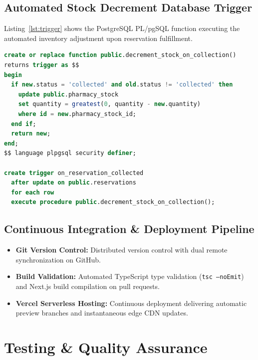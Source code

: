 \documentclass[12pt,a4paper]{report}
\begin{document}
\section{Automated Stock Decrement Database Trigger}
Listing~\ref{lst:trigger} shows the PostgreSQL PL/pgSQL function executing the automated inventory adjustment upon reservation fulfillment.

\begin{lstlisting}[language=SQL, caption={PostgreSQL Stock Decrement Function and Trigger}, label={lst:trigger}]
create or replace function public.decrement_stock_on_collection()
returns trigger as $$
begin
  if new.status = 'collected' and old.status != 'collected' then
    update public.pharmacy_stock
    set quantity = greatest(0, quantity - new.quantity)
    where id = new.pharmacy_stock_id;
  end if;
  return new;
end;
$$ language plpgsql security definer;

create trigger on_reservation_collected
  after update on public.reservations
  for each row
  execute procedure public.decrement_stock_on_collection();
\end{lstlisting}

\section{Continuous Integration & Deployment Pipeline}
\begin{itemize}
    \item \textbf{Git Version Control:} Distributed version control with dual remote synchronization on GitHub.
    \item \textbf{Build Validation:} Automated TypeScript type validation (\texttt{tsc --noEmit}) and Next.js build compilation on pull requests.
    \item \textbf{Vercel Serverless Hosting:} Continuous deployment delivering automatic preview branches and instantaneous edge CDN updates.
\end{itemize}

\newpage
\chapter{Testing \& Quality Assurance}
\end{document}
